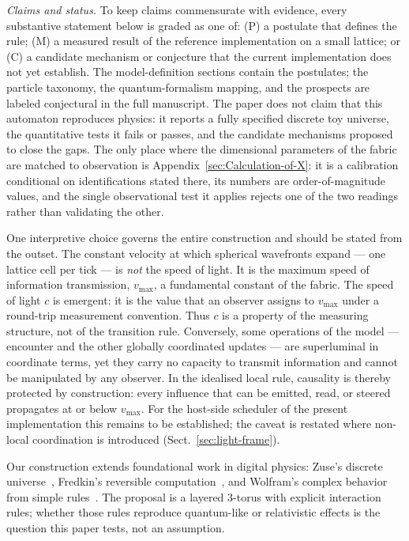 \documentclass[a4paper]{article}
\begin{document}
\emph{Claims and status.} To keep claims commensurate with evidence, every substantive statement below is graded as one of: (P) a postulate that defines the rule; (M) a measured result of the reference implementation on a small lattice; or (C) a candidate mechanism or conjecture that the current implementation does not yet establish.  The model-definition sections contain the postulates; the particle taxonomy, the quantum-formalism mapping, and the prospects are labeled conjectural in the full manuscript.  The paper does not claim that this automaton reproduces physics: it reports a fully specified discrete toy universe, the quantitative tests it fails or passes, and the candidate mechanisms proposed to close the gaps.  The only place where the dimensional parameters of the fabric are matched to observation is Appendix~\ref{sec:Calculation-of-X}: it is a calibration conditional on identifications stated there, its numbers are order-of-magnitude values, and the single observational test it applies rejects one of the two readings rather than validating the other.

One interpretive choice governs the entire construction and should be stated from the outset. The constant velocity at which spherical wavefronts expand --- one lattice cell per tick --- is \emph{not} the speed of light. It is the maximum speed of information transmission, $v_{\max}$, a fundamental constant of the fabric. The speed of light $c$ is emergent: it is the value that an observer assigns to $v_{\max}$ under a round-trip measurement convention. Thus $c$ is a property of the measuring structure, not of the transition rule. Conversely, some operations of the model --- encounter and the other globally coordinated updates --- are superluminal in coordinate terms, yet they carry no capacity to transmit information and cannot be manipulated by any observer. In the idealised local rule, causality is thereby protected by construction: every influence that can be emitted, read, or steered propagates at or below $v_{\max}$.  For the host-side scheduler of the present implementation this remains to be established; the caveat is restated where non-local coordination is introduced (Sect.~\ref{sec:light-frame}).

Our construction extends foundational work in digital physics: Zuse's discrete universe~\cite{zuse}, Fredkin's reversible computation~\cite{fredkin}, and Wolfram's complex behavior from simple rules~\cite{wolfram}. The proposal is a layered 3-torus with explicit interaction rules; whether those rules reproduce quantum-like or relativistic effects is the question this paper tests, not an assumption.
\end{document}
